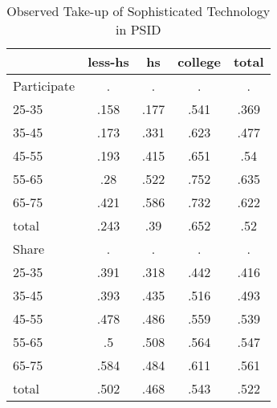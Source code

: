 \begin{table}[htbp]
\caption{\label{clabel} Observed Take-up of Sophisticated Technology in PSID}\centering\medskip
\begin{tabular}{lcccc} \hline \hline
 & less-hs  & hs  & college  & total  \\  \hline 
Participate &         . &         . &         . &         . \\  
25-35 &      .158 &      .177 &      .541 &      .369 \\  
35-45 &      .173 &      .331 &      .623 &      .477 \\  
45-55 &      .193 &      .415 &      .651 &       .54 \\  
55-65 &       .28 &      .522 &      .752 &      .635 \\  
65-75 &      .421 &      .586 &      .732 &      .622 \\  
total &      .243 &       .39 &      .652 &       .52 \\  
Share &         . &         . &         . &         . \\  
25-35 &      .391 &      .318 &      .442 &      .416 \\  
35-45 &      .393 &      .435 &      .516 &      .493 \\  
45-55 &      .478 &      .486 &      .559 &      .539 \\  
55-65 &        .5 &      .508 &      .564 &      .547 \\  
65-75 &      .584 &      .484 &      .611 &      .561 \\  
total &      .502 &      .468 &      .543 &      .522 \\  
\hline \hline \end{tabular}
\end{table}
